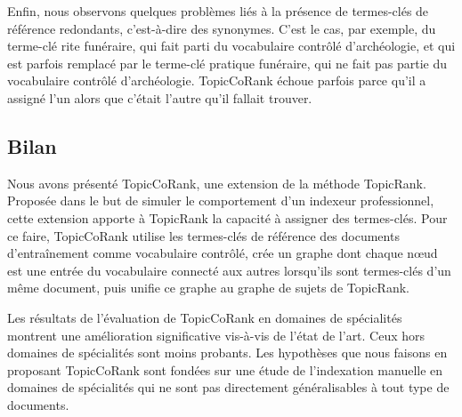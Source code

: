         Enfin, nous observons quelques problèmes liés à la présence de
        termes-clés de référence redondants, c'est-à-dire des synonymes. C'est
        le cas, par exemple, du terme-clé \og{}rite funéraire\fg{}, qui fait
        parti du vocabulaire contrôlé d'archéologie, et qui est parfois remplacé
        par le terme-clé \og{}pratique funéraire\fg{}, qui ne fait pas partie du
        vocabulaire contrôlé d'archéologie. TopicCoRank échoue parfois parce
        qu'il a assigné l'un alors que c'était l'autre qu'il fallait trouver.

    \subsection{Bilan}
    \label{subsec:main-domain_specific_keyphrase_annotation-supervised_automatic_keyphrase_annotation-conclusion}
      Nous avons présenté TopicCoRank, une extension de la méthode TopicRank.
      Proposée dans le but de simuler le comportement d'un indexeur
      professionnel, cette extension apporte à TopicRank la capacité à assigner
      des termes-clés. Pour ce faire, TopicCoRank utilise les termes-clés de
      référence des documents d'entraînement comme vocabulaire contrôlé, crée un
      graphe dont chaque n\oe{}ud est une entrée du vocabulaire connecté aux
      autres lorsqu'ils sont termes-clés d'un même document, puis unifie ce
      graphe au graphe de sujets de TopicRank.

      Les résultats de l'évaluation de TopicCoRank en domaines de spécialités
      montrent une amélioration significative vis-à-vis de l'état de l'art. Ceux
      hors domaines de spécialités sont moins probants. Les hypothèses que nous
      faisons en proposant TopicCoRank sont fondées sur une étude de
      l'indexation manuelle en domaines de spécialités qui ne sont pas
      directement généralisables à tout type de documents.


